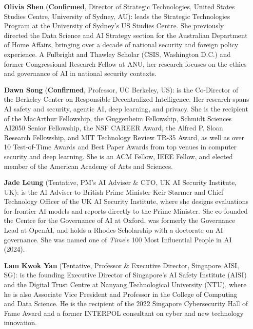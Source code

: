 \documentclass{article}
\newcommand{\confirmed}{\textcolor{green!60!black}{\textbf{Confirmed}}}
\newcommand{\tentative}{\textcolor{orange!80!black}{Tentative}}
\begin{document}
\textbf{Olivia Shen} (\confirmed, Director of Strategic Technologies, United States Studies Centre, University of Sydney, AU): leads the Strategic Technologies Program at the University of Sydney’s US Studies Centre. She previously directed the Data Science and AI Strategy section for the Australian Department of Home Affairs, bringing over a decade of national security and foreign policy experience. A Fulbright and Thawley Scholar (CSIS, Washington D.C.) and former Congressional Research Fellow at ANU, her research focuses on the ethics and governance of AI in national security contexts.

\textbf{Dawn Song} (\confirmed, Professor, UC Berkeley, US): is the Co-Director of the Berkeley Center on Responsible Decentralized Intelligence. Her research spans AI safety and security, agentic AI, deep learning, and privacy. She is the recipient of the MacArthur Fellowship, the Guggenheim Fellowship, Schmidt Sciences AI2050 Senior Fellowship, the NSF CAREER Award, the Alfred P. Sloan Research Fellowship, and MIT Technology Review TR-35 Award, as well as over 10 Test-of-Time Awards and Best Paper Awards from top venues in computer security and deep learning. She is an ACM Fellow, IEEE Fellow, and elected member of the American Academy of Arts and Sciences.
    
\textbf{Jade Leung} (\tentative, PM’s AI Adviser \& CTO, UK AI Security Institute, UK): is the AI Adviser to British Prime Minister Keir Starmer and Chief Technology Officer of the UK AI Security Institute, where she designs evaluations for frontier AI models and reports directly to the Prime Minister. She co-founded the Centre for the Governance of AI at Oxford, was formerly the Governance Lead at OpenAI, and holds a Rhodes Scholarship with a doctorate on AI governance. She was named one of \textit{Time}’s 100 Most Influential People in AI (2024).

 \textbf{Lam Kwok Yan} (\tentative, Professor \& Executive Director, Singapore AISI, SG): is the founding Executive Director of Singapore’s AI Safety Institute (AISI) and the Digital Trust Centre at Nanyang Technological University (NTU), where he is also Associate Vice President and Professor in the College of Computing and Data Science. He is the recipient of the 2022 Singapore Cybersecurity Hall of Fame Award and a former INTERPOL consultant on cyber and new technology innovation.
\end{document}
